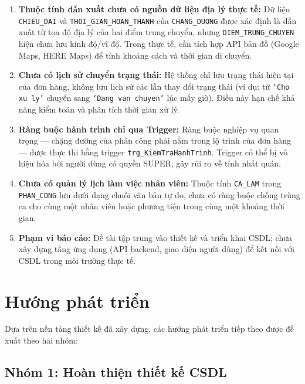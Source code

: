 \documentclass[11pt]{report}
\begin{document}
\begin{enumerate}
    \item \textbf{Thuộc tính dẫn xuất chưa có nguồn dữ liệu địa lý thực tế:} Dữ liệu \texttt{CHIEU\_DAI} và \texttt{THOI\_GIAN\_HOAN\_THANH} của \texttt{CHANG\_DUONG} được xác định là dẫn xuất từ tọa độ địa lý của hai điểm trung chuyển, nhưng \texttt{DIEM\_TRUNG\_CHUYEN} hiện chưa lưu kinh độ/vĩ độ. Trong thực tế, cần tích hợp API bản đồ (Google Maps, HERE Maps) để tính khoảng cách và thời gian di chuyển.

    \item \textbf{Chưa có lịch sử chuyển trạng thái:} Hệ thống chỉ lưu trạng thái hiện tại của đơn hàng, không lưu lịch sử các lần thay đổi trạng thái (ví dụ: từ \texttt{`Cho xu ly'} chuyển sang \texttt{`Dang van chuyen'} lúc mấy giờ). Điều này hạn chế khả năng kiểm toán và phân tích thời gian xử lý.

    \item \textbf{Ràng buộc hành trình chỉ qua Trigger:} Ràng buộc nghiệp vụ quan trọng --- chặng đường của phân công phải nằm trong lộ trình của đơn hàng --- được thực thi bằng trigger \texttt{trg\_KiemTraHanhTrinh}. Trigger có thể bị vô hiệu hóa bởi người dùng có quyền SUPER, gây rủi ro về tính nhất quán.

    \item \textbf{Chưa có quản lý lịch làm việc nhân viên:} Thuộc tính \texttt{CA\_LAM} trong \texttt{PHAN\_CONG} lưu dưới dạng chuỗi văn bản tự do, chưa có ràng buộc chống trùng ca cho cùng một nhân viên hoặc phương tiện trong cùng một khoảng thời gian.

    \item \textbf{Phạm vi báo cáo:} Đề tài tập trung vào thiết kế và triển khai CSDL; chưa xây dựng tầng ứng dụng (API backend, giao diện người dùng) để kết nối với CSDL trong môi trường thực tế.
\end{enumerate}


\section{Hướng phát triển}
\label{sec:ketluan_huongphat}

Dựa trên nền tảng thiết kế đã xây dựng, các hướng phát triển tiếp theo được đề xuất theo hai nhóm:

\subsection*{Nhóm 1: Hoàn thiện thiết kế CSDL}
\end{document}
